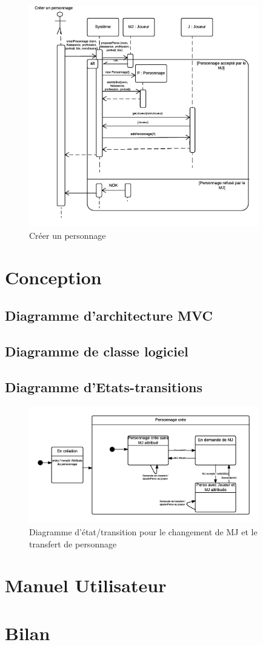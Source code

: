 \documentclass[a4paper,oneside,10pt]{article}
\begin{document}
\begin{figure}[H]
	\begin{center}
		\includegraphics[width=10cm]{images/sequence/DS-CreerPerso.png}  
		\caption{Créer un personnage}
	\end{center}
\end{figure}
\section{Conception}
\subsection{Diagramme d'architecture MVC}
\subsection{Diagramme de classe logiciel}

\subsection{Diagramme d'Etats-transitions}
\begin{figure}[H]
	\begin{center}
		\includegraphics[width=10cm]{images/sequence/ET-Personnage.png}  
		\caption{Diagramme d'état/transition pour le changement de MJ et le transfert de personnage}
	\end{center}
\end{figure}


\section{Manuel Utilisateur}


\section{Bilan}
\end{document}
